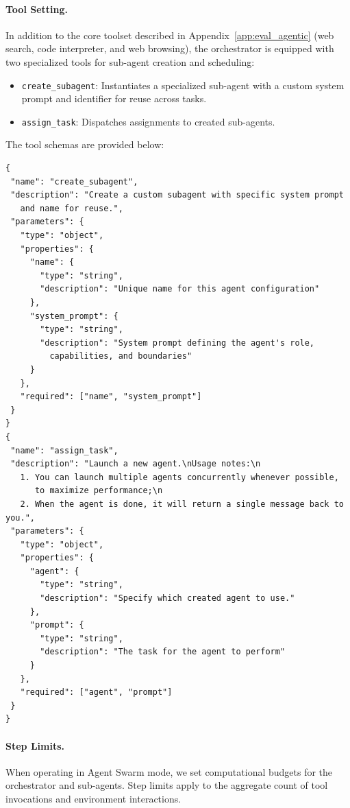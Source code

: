 \paragraph{Tool Setting.} In addition to the core toolset described in Appendix~\ref{app:eval_agentic} (web search, code interpreter, and web browsing), the orchestrator is equipped with two specialized tools for sub-agent creation and scheduling:

\begin{itemize}
    \item \texttt{create\_subagent}: Instantiates a specialized sub-agent with a custom system prompt and identifier for reuse across tasks.
    \item \texttt{assign\_task}: Dispatches assignments to created sub-agents.
\end{itemize}

The tool schemas are provided below:

{
\small
\begin{verbatim}
{
 "name": "create_subagent",
 "description": "Create a custom subagent with specific system prompt 
   and name for reuse.",
 "parameters": {
   "type": "object",
   "properties": {
     "name": {
       "type": "string",
       "description": "Unique name for this agent configuration"
     },
     "system_prompt": {
       "type": "string",
       "description": "System prompt defining the agent's role, 
         capabilities, and boundaries"
     }
   },
   "required": ["name", "system_prompt"]
 }
}
{
 "name": "assign_task",
 "description": "Launch a new agent.\nUsage notes:\n
   1. You can launch multiple agents concurrently whenever possible,
      to maximize performance;\n
   2. When the agent is done, it will return a single message back to you.",
 "parameters": {
   "type": "object",
   "properties": {
     "agent": {
       "type": "string",
       "description": "Specify which created agent to use."
     },
     "prompt": {
       "type": "string",
       "description": "The task for the agent to perform"
     }
   },
   "required": ["agent", "prompt"]
 }
}
\end{verbatim}
}

\paragraph{Step Limits.} When operating in Agent Swarm mode, we set computational budgets for the orchestrator and sub-agents. Step limits apply to the aggregate count of tool invocations and environment interactions.


